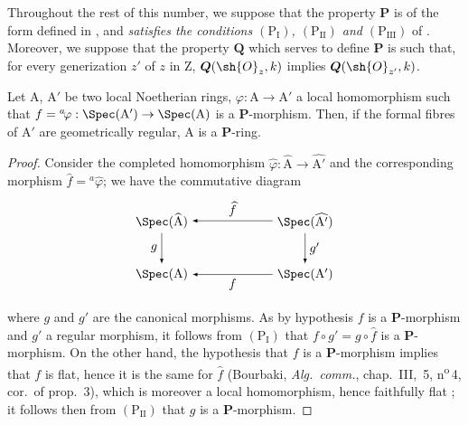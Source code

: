 \begin{env}[7.4.1]
\label{IV.7.4.1}
Throughout the rest of this number, we suppose that the property $\boldsymbol{P}$ is of the form defined in , and \emph{satisfies the conditions $(\mathrm{P_I})$, $(\mathrm{P_{II}})$ and $(\mathrm{P_{III}})$} of .
Moreover, we suppose that the property $\boldsymbol{Q}$ which serves to define $\boldsymbol{P}$ is such that, for every generization $z'$ of $z$ in $\mathrm{Z}$, $\boldsymbol{Q}(\sh{O}_z,k)$ implies $\boldsymbol{Q}(\sh{O}_{z'},k)$.
\end{env}

\begin{lemma}[7.4.2]
\label{IV.7.4.2}
Let $\mathrm{A}$, $\mathrm{A}'$ be two local Noetherian rings, $\varphi:\mathrm{A}\to\mathrm{A}'$ a local homomorphism such that $f={}^a\!\varphi:\Spec(\mathrm{A}')\to\Spec(\mathrm{A})$ is a $\boldsymbol{P}$-morphism.
Then, if the formal fibres of $\mathrm{A}'$ are geometrically regular, $\mathrm{A}$ is a $\boldsymbol{P}$-ring.
\end{lemma}


\begin{proof}
Consider the completed homomorphism $\widehat{\varphi}:\widehat{\mathrm{A}}\to\widehat{\mathrm{A}'}$ and the corresponding morphism $\widehat{f}={}^a\!\widehat{\varphi}$; we have the commutative diagram
\[
\begin{tikzpicture}[>=latex]
\node (tl) at (0,1.5) {$\Spec(\widehat{\mathrm{A}})$};
\node (tr) at (4,1.5) {$\Spec(\widehat{\mathrm{A}'})$};
\node (bl) at (0,0) {$\Spec(\mathrm{A})$};
\node (br) at (4,0) {$\Spec(\mathrm{A}')$};
\draw[->] (tr) -- node[above] {$\widehat{f}$} (tl);
\draw[->] (tl) -- node[left] {$g$} (bl);
\draw[->] (tr) -- node[right] {$g'$} (br);
\draw[->] (br) -- node[below] {$f$} (bl);
\end{tikzpicture}
\]
where $g$ and $g'$ are the canonical morphisms.
As by hypothesis $f$ is a $\boldsymbol{P}$-morphism and $g'$ a regular morphism, it follows from $(\mathrm{P_I})$ that $f\circ g'=g\circ\widehat{f}$ is a $\boldsymbol{P}$-morphism.
On the other hand, the hypothesis that $f$ is a $\boldsymbol{P}$-morphism implies that $f$ is flat, hence it is the same for $\widehat{f}$ (Bourbaki, \emph{Alg.\ comm.}, chap.~III, \textsection\,5, n\textsuperscript{o}\,4, cor.~of prop.~3), which is moreover a local homomorphism, hence faithfully flat ; it follows then from $(\mathrm{P_{II}})$ that $g$ is a $\boldsymbol{P}$-morphism.
\end{proof}

